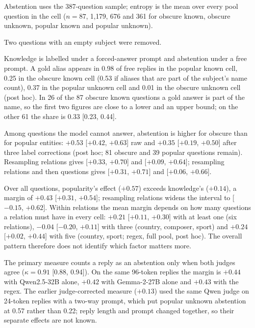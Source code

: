 
Abstention uses the 387-question sample; entropy is the mean over every pool question in the cell ($n=87$, 1{,}179, 676 and 361 for obscure known, obscure unknown, popular known and popular unknown).

Two questions with an empty subject were removed.

Knowledge is labelled under a forced-answer prompt and abstention under a free prompt. A gold alias appears in 0.98 of free replies in the popular known cell, 0.25 in the obscure known cell (0.53 if aliases that are part of the subject's name count), 0.37 in the popular unknown cell and 0.01 in the obscure unknown cell (post hoc). In 26 of the 87 obscure known questions a gold answer is part of the name, so the first two figures are close to a lower and an upper bound; on the other 61 the share is 0.33 [0.23, 0.44].

Among questions the model cannot answer, abstention is higher for obscure than for popular entities: $+0.53$ [$+0.42$, $+0.63$] raw and $+0.35$ [$+0.19$, $+0.50$] after three label corrections (post hoc; 81 obscure and 39 popular questions remain). Resampling relations gives [$+0.33$, $+0.70$] and [$+0.09$, $+0.64$]; resampling relations and then questions gives [$+0.31$, $+0.71$] and [$+0.06$, $+0.66$].

Over all questions, popularity's effect ($+0.57$) exceeds knowledge's ($+0.14$), a margin of $+0.43$ [$+0.31$, $+0.54$]; resampling relations widens the interval to [$-0.15$, $+0.62$]. Within relations the mean margin depends on how many questions a relation must have in every cell: $+0.21$ [$+0.11$, $+0.30$] with at least one (six relations), $-0.04$ [$-0.20$, $+0.11$] with three (country, composer, sport) and $+0.24$ [$+0.02$, $+0.44$] with five (country, sport; regex, full pool, post hoc). The overall pattern therefore does not identify which factor matters more.

The primary measure counts a reply as an abstention only when both judges agree ($\kappa=0.91$ [0.88, 0.94]). On the same 96-token replies the margin is $+0.44$ with Qwen2.5-32B alone, $+0.42$ with Gemma-2-27B alone and $+0.43$ with the regex. The earlier judge-corrected measure ($+0.13$) used the same Qwen judge on 24-token replies with a two-way prompt, which put popular unknown abstention at 0.57 rather than 0.22; reply length and prompt changed together, so their separate effects are not known.

